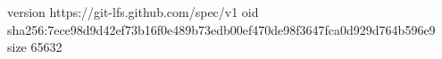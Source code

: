 version https://git-lfs.github.com/spec/v1
oid sha256:7ece98d9d42ef73b16f0e489b73edb00ef470de98f3647fca0d929d764b596e9
size 65632
